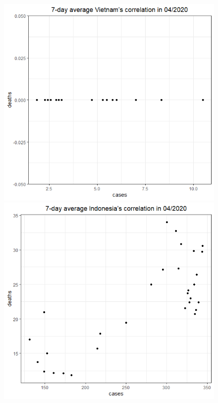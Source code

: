 \documentclass[a4paper]{article}
\theoremstyle{definition}
\begin{document}
\begin{enumerate}[1)]
\begin{figure}[H]
\begin{center}
        \includegraphics[scale = 0.3]{ix/ix.3/VN_04_2020.png}
        \includegraphics[scale = 0.3]{ix/ix.3/IDN_04_2020.png}

\end{center}
\end{figure}
\end{enumerate}
\end{document}
